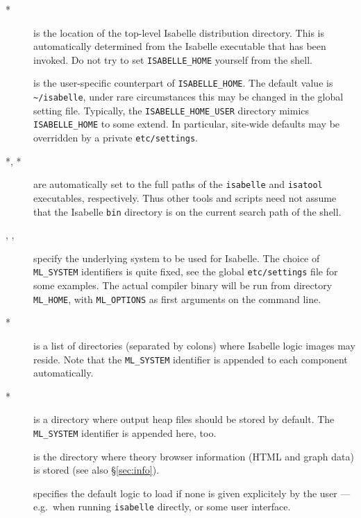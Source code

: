 \begin{description}
\item[*] is the location of the top-level
  Isabelle distribution directory. This is automatically determined
  from the Isabelle executable that has been invoked.  Do not try to
  set \texttt{ISABELLE_HOME} yourself from the shell.
  
\item[] is the user-specific counterpart of
  \texttt{ISABELLE_HOME}. The default value is
  \texttt{\~\relax/isabelle}, under rare circumstances this may be
  changed in the global setting file.  Typically, the
  \texttt{ISABELLE_HOME_USER} directory mimics \texttt{ISABELLE_HOME}
  to some extend. In particular, site-wide defaults may be overridden
  by a private \texttt{etc/settings}.
  
\item[*, *] are automatically set to
  the full paths of the \texttt{isabelle} and \texttt{isatool}
  executables, respectively.  Thus other tools and scripts need not
  assume that the Isabelle \texttt{bin} directory is on the current
  search path of the shell.

\item[, , ]
  specify the underlying {\ML} system to be used for Isabelle.  The
  choice of \texttt{ML_SYSTEM} identifiers is quite fixed, see the
  global \texttt{etc/settings} file for some examples. The actual
  compiler binary will be run from directory \texttt{ML_HOME}, with
  \texttt{ML_OPTIONS} as first arguments on the command line.
  
\item[*] is a list of directories (separated by
  colons) where Isabelle logic images may reside. Note that the
  \texttt{ML_SYSTEM} identifier is appended to each component
  automatically.
  
\item[*] is a directory where output heap
  files should be stored by default. The \texttt{ML_SYSTEM} identifier
  is appended here, too.
  
\item[] is the directory where theory
  browser information (HTML and graph data) is stored (see also
  \S\ref{sec:info}).

\item[] specifies the default logic to load if
  none is given explicitely by the user --- e.g.\ when running
  \texttt{isabelle} directly, or some user interface.
  

\end{description}
